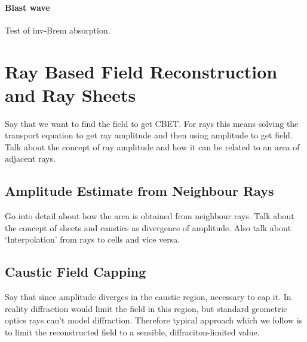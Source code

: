 \paragraph*{Blast wave}
Test of \ac{inv-Brem} absorption.

\section{Ray Based Field Reconstruction and Ray Sheets}
\label{sec:SOLAS_field_reconstruc}

Say that we want to find the field to get CBET.
For rays this means solving the transport equation to get ray amplitude and then using amplitude to get field.
Talk about the concept of ray amplitude and how it can be related to an area of adjacent rays.

\subsection{Amplitude Estimate from Neighbour Rays}
\label{sec:SOLAS_ray_amplitude}

Go into detail about how the area is obtained from neighbour rays.
Talk about the concept of sheets and caustics as divergence of amplitude.
Also talk about `Interpolation' from rays to cells and vice versa.

\subsection{Caustic Field Capping}
Say that since amplitude diverges in the caustic region, necessary to cap it.
In reality diffraction would limit the field in this region, but standard geometric optics rays can't model diffraction.
Therefore typical approach which we follow is to limit the reconstructed field to a sensible, diffraciton-limited value.

